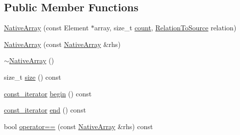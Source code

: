 \subsection*{Public Member Functions}
\begin{DoxyCompactItemize}
\item 
\hyperlink{classtesting_1_1internal_1_1NativeArray_a568de999aca0fc0c2cc574fac2405872}{Native\-Array} (const Element $\ast$array, size\-\_\-t \hyperlink{tracking_8hpp_a88d78b1935cd8bdee70a44eaaf326b1e}{count}, \hyperlink{namespacetesting_1_1internal_aec4f0eeb60b6b8af8dcf979578bbf3bb}{Relation\-To\-Source} relation)
\item 
\hyperlink{classtesting_1_1internal_1_1NativeArray_abb346ac3040f5da733f594cc2d5958bc}{Native\-Array} (const \hyperlink{classtesting_1_1internal_1_1NativeArray}{Native\-Array} \&rhs)
\item 
\hyperlink{classtesting_1_1internal_1_1NativeArray_a55ab5948d473a487303dcf6e02ad1f60}{$\sim$\-Native\-Array} ()
\item 
size\-\_\-t \hyperlink{classtesting_1_1internal_1_1NativeArray_a45de2485baac8bf148e2943828094a40}{size} () const 
\item 
\hyperlink{classtesting_1_1internal_1_1NativeArray_a9ce7c8408460d7158a2870456d134557}{const\-\_\-iterator} \hyperlink{classtesting_1_1internal_1_1NativeArray_a49c534d29034d9230372ada54ef961bb}{begin} () const 
\item 
\hyperlink{classtesting_1_1internal_1_1NativeArray_a9ce7c8408460d7158a2870456d134557}{const\-\_\-iterator} \hyperlink{classtesting_1_1internal_1_1NativeArray_a4957ad1ebf7c21eab07d5e0ae2bb17aa}{end} () const 
\item 
bool \hyperlink{classtesting_1_1internal_1_1NativeArray_a60af8d9c429771ee131b5ddf7e06e3c9}{operator==} (const \hyperlink{classtesting_1_1internal_1_1NativeArray}{Native\-Array} \&rhs) const 
\end{DoxyCompactItemize}


